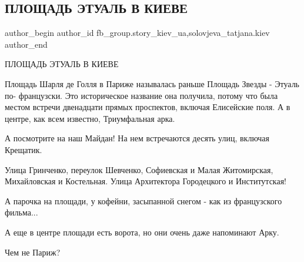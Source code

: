  
 
 
 
 
 
\subsection{ПЛОЩАДЬ ЭТУАЛЬ В КИЕВЕ}
\label{sec:30_01_2022.fb.fb_group.story_kiev_ua.2.ploschad_etual_v_kieve}
 
\ifcmt
 author_begin
   author_id fb_group.story_kiev_ua,solovjeva_tatjana.kiev
 author_end
\fi

ПЛОЩАДЬ ЭТУАЛЬ В КИЕВЕ

Площадь Шарля де Голля в Париже называлась раньше Площадь Звезды - Этуаль по-
французски. Это историческое название она получила, потому что была местом
встречи двенадцати прямых проспектов, включая Елисейские поля. А в центре, как
всем известно, Триумфальная арка.


А посмотрите на наш Майдан! На нем встречаются десять улиц, включая Крещатик.

Улица Гринченко, переулок Шевченко, Софиевская и Малая Житомирская,
Михайловская и Костельная. Улица Архитектора Городецкого и Институтская!

А парочка на площади, у кофейни, засыпанной снегом - как из французского
фильма...

А еще в центре площади есть ворота, но они очень даже напоминают Арку.

Чем не Париж?
